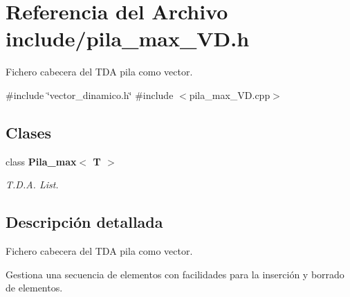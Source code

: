 \section{Referencia del Archivo include/pila\+\_\+max\+\_\+\+VD.h}
\label{pila__max__VD_8h}


Fichero cabecera del T\+DA pila como vector.  


{\ttfamily \#include \char`\"{}vector\+\_\+dinamico.\+h\char`\"{}}\newline
{\ttfamily \#include $<$pila\+\_\+max\+\_\+\+V\+D.\+cpp$>$}\newline
\subsection*{Clases}
\begin{DoxyCompactItemize}
\item 
class {\bf Pila\+\_\+max$<$ T $>$}
\begin{DoxyCompactList}\small\item\em T.\+D.\+A. List. \end{DoxyCompactList}\end{DoxyCompactItemize}


\subsection{Descripción detallada}
Fichero cabecera del T\+DA pila como vector. 

Gestiona una secuencia de elementos con facilidades para la inserción y borrado de elementos. 